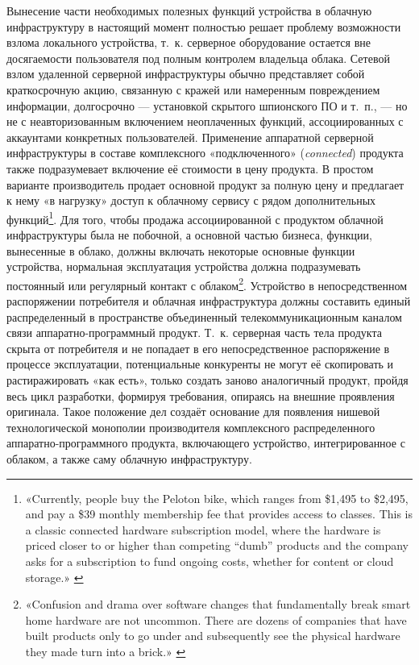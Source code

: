 \documentclass{article}
\let\textitorig\textit
\renewcommand{\textit}[1]{{\fontfamily{cmr}\selectfont \textitorig{#1}}}
\begin{document}
Вынесение части необходимых полезных функций устройства в облачную инфраструктуру в настоящий момент полностью решает проблему возможности взлома локального устройства, т.~к. серверное оборудование остается вне досягаемости пользователя под полным контролем владельца облака. Сетевой взлом удаленной серверной инфраструктуры обычно представляет собой краткосрочную акцию, связанную с кражей или намеренным повреждением информации, долгосрочно — установкой скрытого шпионского ПО и т.~п., — но не с неавторизованным включением неоплаченных функций, ассоциированных с аккаунтами конкретных пользователей. Применение аппаратной серверной инфраструктуры в составе комплексного «подключенного» (\textit{connected}) продукта также подразумевает включение её стоимости в цену продукта. В простом варианте производитель продает основной продукт за полную цену и предлагает к нему «в нагрузку» доступ к облачному сервису с рядом дополнительных функций\footnote{«Currently, people buy the Peloton bike, which ranges from \$1,495 to \$2,495, and pay a \$39 monthly membership fee that provides access to classes. This is a classic connected hardware subscription model, where the hardware is priced closer to or higher than competing “dumb” products and the company asks for a subscription to fund ongoing costs, whether for content or cloud storage.» \cite{staceyoniotFeatureOfHardwareSubscription2022}}. Для того, чтобы продажа ассоциированной с продуктом облачной инфраструктуры была не побочной, а основной частью бизнеса, функции, вынесенные в облако, должны включать некоторые основные функции устройства, нормальная эксплуатация устройства должна подразумевать постоянный или регулярный контакт с облаком\footnote{«Confusion and drama over software changes that fundamentally break smart home hardware are not uncommon. There are dozens of companies that have built products only to go under and subsequently see the physical hardware they made turn into a brick.» \cite{staceyoniotYourHardwareIsAllSoftware2019}}. Устройство в непосредственном распоряжении потребителя и облачная инфраструктура должны составить единый распределенный в пространстве объединенный телекоммуникационным каналом связи аппаратно-программный продукт. Т.~к. серверная часть тела продукта скрыта от потребителя и не попадает в его непосредственное распоряжение в процессе эксплуатации, потенциальные конкуренты не могут её скопировать и растиражировать «как есть», только создать заново аналогичный продукт, пройдя весь цикл разработки, формируя требования, опираясь на внешние проявления оригинала. Такое положение дел создаёт основание для появления нишевой технологической монополии производителя комплексного распределенного аппаратно-программного продукта, включающего устройство, интегрированное с облаком, а также саму облачную инфраструктуру.
\end{document}
